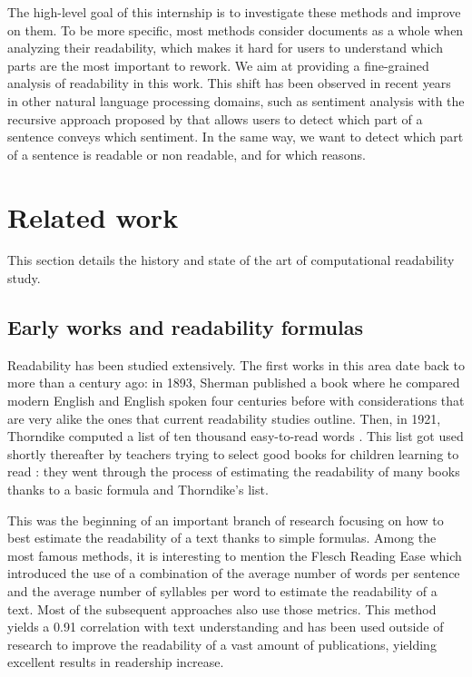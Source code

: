 \documentclass[a4paper, 11pt, onepage]{scrreprt}
\begin{document}
The high-level goal of this internship is to investigate these methods
and improve on them. To be more specific, most methods consider
documents as a whole when analyzing their readability, which makes it
hard for users to understand which parts are the most important to
rework. We aim at providing a fine-grained analysis of readability in
this work. This shift has been observed in recent years in other
natural language processing domains, such as sentiment analysis with
the recursive approach proposed by \cite{socher2013recursive} that
allows users to detect which part of a sentence conveys which
sentiment. In the same way, we want to detect which part of a sentence
is readable or non readable, and for which reasons.

\chapter{Related work}
\label{cha:sota}

This section details the history and state of the art of computational
readability study.

\section{Early works and readability formulas}
\label{sec:early-works-and-formulas}
Readability has been studied extensively. The first works in this area
date back to more than a century ago: in 1893, Sherman published a
book \cite{sherman1893analytics} where he compared modern English and
English spoken four centuries before with considerations that are very
alike the ones that current readability studies outline. Then, in
1921, Thorndike computed a list of ten thousand easy-to-read words
\cite{thorndike1921teacher}. This list got used shortly thereafter by
teachers trying to select good books for children learning to read
\cite{lively1923method}: they went through the process of estimating
the readability of many books thanks to a basic formula and
Thorndike's list.

This was the beginning of an important branch of research focusing on
how to best estimate the readability of a text thanks to simple
formulas. Among the most famous methods, it is interesting to mention
the Flesch Reading Ease \cite{flesch1948new} which introduced the use
of a combination of the average number of words per sentence and the
average number of syllables per word to estimate the readability of a
text. Most of the subsequent approaches also use those metrics. This
method yields a 0.91 correlation with text understanding and has been
used outside of research to improve the readability of a vast amount
of publications, yielding excellent results in readership increase.
\end{document}
